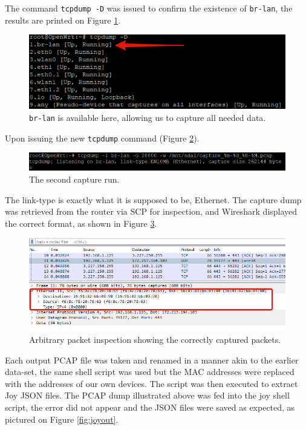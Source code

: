 \documentclass{article}
\begin{document}
The command \texttt{tcpdump -D} was issued to confirm the existence of
\texttt{br-lan}, the results are printed on Figure \ref{fig:interfacelist}.

\begin{figure}[!ht]
    \centering
    \includegraphics[width=13cm]{InputSystem/InterfaceList.png}
    \caption{\texttt{br-lan} is available here, allowing us to capture all needed data.} 
    \label{fig:interfacelist}
\end{figure}

Upon issuing the new \texttt{tcpdump} command (Figure \ref{fig:secondrun}).

\begin{figure}[!ht]
    \centering
    \includegraphics[width=13cm]{InputSystem/SecondRun.png}
    \caption{The second capture run.} 
    \label{fig:secondrun}
\end{figure}

The link-type is exactly what it is supposed to be, Ethernet. The
capture dump was retrieved from the router via SCP for inspection, and
Wireshark displayed the correct format, as shown in Figure \ref{fig:confirmation}.\newline

\begin{figure}[!ht]
    \centering
    \includegraphics[width=13cm]{InputSystem/Confirmation.png}
    \caption{Arbitrary packet inspection showing the correctly captured packets.} 
    \label{fig:confirmation}
\end{figure}
\pagebreak
Each output PCAP file was taken and renamed in a manner akin to the earlier data-set, the same shell script was used but the MAC addresses were replaced with the addresses of our own devices. The script was then executed to extract Joy JSON files. The PCAP dump illustrated above was fed into the joy shell script, the error did not appear and the JSON files were saved as expected, as pictured on Figure \ref{fig:joyout}.\newline
\end{document}
